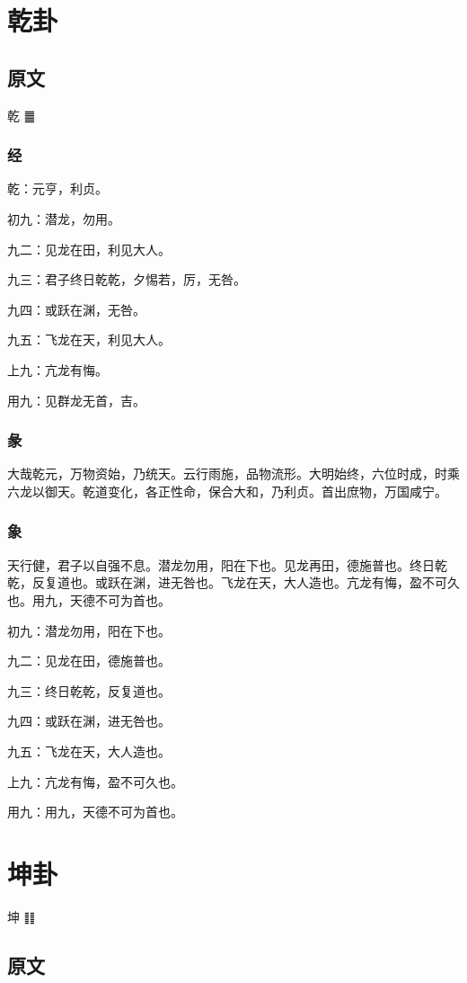 \documentclass[12pt,oneside]{book}
\begin{document}
\chapter{乾卦}
\section{原文}
乾  {\Large ䷀}


\subsection{经}
乾：元亨，利贞。

初九：潜龙，勿用。

九二：见龙在田，利见大人。

九三：君子终日乾乾，夕惕若，厉，无咎。

九四：或跃在渊，无咎。

九五：飞龙在天，利见大人。

上九：亢龙有悔。

用九：见群龙无首，吉。


\subsection{彖}
大哉乾元，万物资始，乃统天。云行雨施，品物流形。大明始终，六位时成，时乘六龙以御天。乾道变化，各正性命，保合大和，乃利贞。首出庶物，万国咸宁。

\subsection{象}
天行健，君子以自强不息。潜龙勿用，阳在下也。见龙再田，德施普也。终日乾乾，反复道也。或跃在渊，进无咎也。飞龙在天，大人造也。亢龙有悔，盈不可久也。用九，天德不可为首也。

初九：潜龙勿用，阳在下也。

九二：见龙在田，德施普也。

九三：终日乾乾，反复道也。

九四：或跃在渊，进无咎也。

九五：飞龙在天，大人造也。

上九：亢龙有悔，盈不可久也。

用九：用九，天德不可为首也。


\chapter{坤卦}
坤 {\Large ䷁}

\section{原文}
\end{document}
